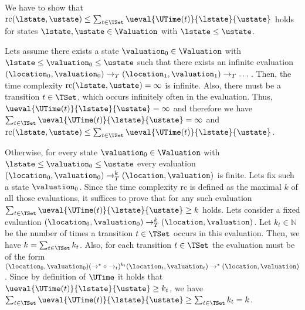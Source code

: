 We have to show that $\text{rc}(\lstate, \ustate) \leq \sum_{t \in \TSet} \ueval{\UTime(t)}{\lstate}{\ustate}$ holds for states $\lstate, \ustate \in \Valuation$ with $\lstate \leq \ustate$.

Lets assume there exists a state $\valuation_0 \in \Valuation$ with $\lstate \leq \valuation_0 \leq \ustate$ such that there exists an infinite evaluation $(\location_0, \valuation_0) \rightarrow_T (\location_1, \valuation_1) \rightarrow_T \dots$.
Then, the time complexity $\text{rc}(\lstate, \ustate) = \infty$ is infinite.
Also, there must be a transition $t \in \TSet$, which occurs infinitely often in the evaluation.
Thus, $\ueval{\UTime(t)}{\lstate}{\ustate} = \infty$ and therefore we have $\sum_{t \in \TSet} \ueval{\UTime(t)}{\lstate}{\ustate} = \infty$ and $\text{rc}(\lstate, \ustate) \leq \sum_{t \in \TSet} \ueval{\UTime(t)}{\lstate}{\ustate}$.

Otherwise, for every state $\valuation_0 \in \Valuation$ with $\lstate \leq \valuation_0 \leq \ustate$ every evaluation $(\location_0, \valuation_0) \rightarrow^k_T (\location, \valuation)$ is finite.
Lets fix such a state $\valuation_0$.
Since the time complexity $\text{rc}$ is defined as the maximal $k$ of all those evaluations, it suffices to prove that for any such evaluation $\sum_{t \in \TSet} \ueval{\UTime(t)}{\lstate}{\ustate} \geq k$ holds.
Lets consider a fixed evaluation $(\location_0, \valuation_0) \rightarrow^k_T (\location, \valuation)$.
Let $k_t \in \mathbb{N}$ be the number of times a transition $t \in \TSet$ occurs in this evaluation.
Then, we have $k = \sum_{t \in \TSet} k_t$.
Also, for each transition $t \in \TSet$ the evaluation must be of the form $(\location_0, \valuation_0) (\rightarrow^* \circ \rightarrow_t)^{k_t} (\location_t, \valuation_t) \rightarrow^* (\location, \valuation)$.
Since by definition of $\UTime$ it holds that $\ueval{\UTime(t)}{\lstate}{\ustate} \geq k_t$, we have $\sum_{t \in \TSet} \ueval{\UTime(t)}{\lstate}{\ustate} \geq \sum_{t \in \TSet} k_t = k$.

